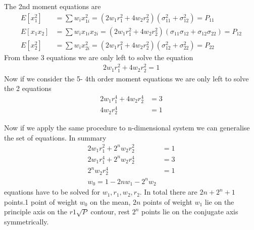 \documentclass[landscape]{slides}
\begin{document}
\begin{slide}
 The 2nd moment equations are
 \begin{align*} 
E[x_1^2]&=\sum{w_ix_{1i}^2}=(2w_1r_1^2+4w_2r_2^2)(\sigma_{11}^2+\sigma_{12}^2)=P_{11}\\ E[x_1x_2]&=\sum{w_ix_{1i}x_{2i}}=(2w_1r_1^2+4w_2r_2^2)(\sigma_{11}\sigma_{12}+\sigma_{12}\sigma_{22})=P_{12}\\
E[x_2^2]&=\sum{w_ix_{2i}^2}=(2w_1r_1^2+4w_2r_2^2)(\sigma_{12}^2+\sigma_{22}^2)=P_{22}
 \end{align*} 
 From these 3 equations we are only left to solve the equation
 \begin{align*}
 2w_1r_1^2+4w_2r_2^2=1
 \end{align*}
 Now if we consider the 5- 4th order moment equations 
 we are only left to solve the 2 equations
  \begin{align*}
 2w_1r_1^4+4w_2r_2^4&=3\\
 4w_2r_2^4&=1
 \end{align*}
 \end{slide}
 \begin{slide}
 Now if we apply the same procedure to n-dimensional system we can generalise the set of equations. In summary 
 \begin{align*}
 2w_1r_1^2+2^nw_2r_2^2&=1\\
  2w_1r_1^4+2^nw_2r_2^4&=3\\
 2^nw_2r_2^4&=1\\
 w_0=1-2nw_1-2^nw_2
 \end{align*} 
 equations have to be solved for $w_1,r_1,w_2,r_2$. In total there are {\bf $2n+2^n+1$} points.1 point of weight $w_0$ on the mean, $2n$ points of weight $w_1$ lie on the principle axis on the $r1\sqrt{P}$ contour, rest $2^n$ points lie on the conjugate axis symmetrically. \newline\newline
   	\end{slide}
\end{document}
